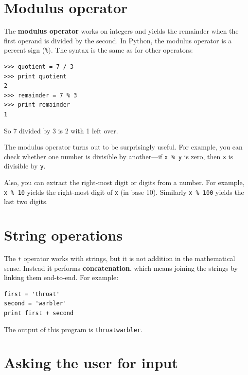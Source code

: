 \documentclass[10pt]{book}
\begin{document}
\section{Modulus operator}


The {\bf modulus operator} works on integers and yields the remainder
when the first operand is divided by the second.  In Python, the
modulus operator is a percent sign (\verb"%").  The syntax is the same
as for other operators:

\beforeverb
\begin{verbatim}
>>> quotient = 7 / 3
>>> print quotient
2
>>> remainder = 7 % 3
>>> print remainder
1
\end{verbatim}
\afterverb
%
So 7 divided by 3 is 2 with 1 left over.

The modulus operator turns out to be surprisingly useful.  For
example, you can check whether one number is divisible by another---if
{\tt x \% y} is zero, then {\tt x} is divisible by {\tt y}.


Also, you can extract the right-most digit
or digits from a number.  For example, {\tt x \% 10} yields the
right-most digit of {\tt x} (in base 10).  Similarly {\tt x \% 100}
yields the last two digits.



\section{String operations}

The {\tt +} operator works with strings, but it
is not addition in the mathematical sense. Instead it performs
{\bf concatenation}, which means joining the strings by
linking them end-to-end.  For example:


\beforeverb
\begin{verbatim}
first = 'throat'
second = 'warbler'
print first + second
\end{verbatim}
\afterverb
%
The output of this program is {\tt throatwarbler}.

\section{Asking the user for input}
\end{document}
